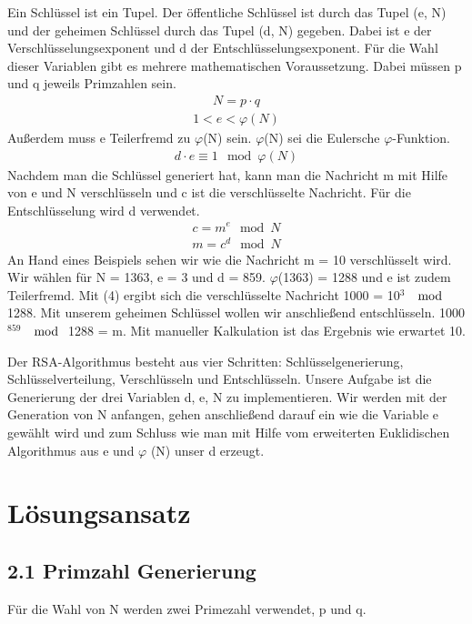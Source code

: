 \documentclass[course=asp]{aspdoc}
\begin{document}
Ein Schlüssel ist ein Tupel. Der öffentliche Schlüssel ist durch das Tupel (e, N) und der geheimen Schlüssel durch das Tupel (d, N) gegeben. Dabei ist e der Verschlüsselungsexponent und d der Entschlüsselungsexponent. Für die Wahl dieser Variablen gibt es mehrere mathematischen Voraussetzung. Dabei müssen p und q jeweils Primzahlen sein.
\begin{align}
 N = p \cdot q
\end{align}
\begin{align}
1 < e < \varphi (N)
\end{align}
Außerdem muss e Teilerfremd zu $\varphi $(N) sein. $\varphi $(N) sei die Eulersche $\varphi $-Funktion.
\begin{align}
d \cdot e \equiv 1 \mod \varphi (N)
\end{align}
Nachdem man die Schlüssel generiert hat, kann man die Nachricht m mit Hilfe von e und N verschlüsseln und c ist die verschlüsselte Nachricht. Für die Entschlüsselung wird d verwendet.
\begin{align}
c {=} m^e \mod N
\end{align} 
\begin{align}
m {=} c^d \mod N
\end{align} 
An Hand eines Beispiels sehen wir wie die Nachricht m = 10 verschlüsselt wird. Wir wählen für N = 1363, e = 3 und d = 859. $\varphi $(1363) = 1288 und e ist zudem Teilerfremd. Mit (4) ergibt sich die verschlüsselte Nachricht 1000 = 10$^{3}$ $\mod $ 1288. Mit unserem geheimen Schlüssel wollen wir anschließend entschlüsseln. 1000$^{859}$ $\mod $ 1288 = m. Mit manueller Kalkulation ist das Ergebnis wie erwartet 10.

Der RSA-Algorithmus besteht aus vier Schritten: Schlüsselgenerierung, Schlüsselverteilung, Verschlüsseln und Entschlüsseln. Unsere Aufgabe ist die Generierung der drei Variablen d, e, N zu implementieren. Wir werden mit der Generation von N anfangen, gehen anschließend darauf ein wie die Variable e gewählt wird und zum Schluss wie man mit Hilfe vom erweiterten Euklidischen Algorithmus aus e und $\varphi $ (N) unser d erzeugt.

\section{Lösungsansatz}  
\subsection*{2.1 Primzahl Generierung }
Für die Wahl von N werden zwei Primezahl verwendet, p und q.
\end{document}
